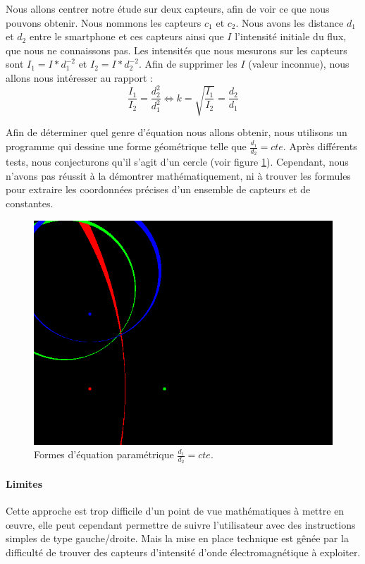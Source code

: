 Nous allons centrer notre étude sur deux capteurs, afin de voir ce que nous pouvons obtenir. Nous nommons les capteurs $c_1$ et $c_2$. Nous avons les distance $d_1$ et $d_2$ entre le smartphone et ces capteurs ainsi que $I$ l'intensité initiale du flux, que nous ne connaissons pas. Les intensités que nous mesurons sur les capteurs sont $I_1=I*d_1^{-2}$ et $I_2=I*d_2^{-2}$. Afin de supprimer les $I$ (valeur inconnue), nous allons nous intéresser au rapport :
\[ \frac{I_1}{I_2} = \frac{d_2^2}{d_1^2} \Leftrightarrow k=\sqrt{\frac{I_1}{I_2}}=\frac{d_2}{d_1} \]

Afin de déterminer quel genre d'équation nous allons obtenir, nous utilisons un programme qui dessine une forme géométrique telle que $\frac{d_1}{d_2} = cte$. Après différents tests, nous conjecturons qu'il s'agit d'un cercle (voir figure \ref{circle}). Cependant, nous n'avons pas réussit à la démontrer mathématiquement, ni à trouver les formules pour extraire les coordonnées précises d'un ensemble de capteurs et de constantes.

\begin{figure}
    \begin{center}
        \includegraphics[width=0.75\linewidth]{rcs/circle.png}
    \end{center}
    \caption{Formes d'équation paramétrique $\frac{d_1}{d_2}=cte$.}
    \label{circle}
\end{figure}

\paragraph{Limites} Cette approche est trop difficile d'un point de vue mathématiques à mettre en œuvre, elle peut cependant permettre de suivre l'utilisateur avec des instructions simples de type gauche/droite. Mais la mise en place technique est gênée par la difficulté de trouver des capteurs d'intensité d'onde électromagnétique à exploiter.

